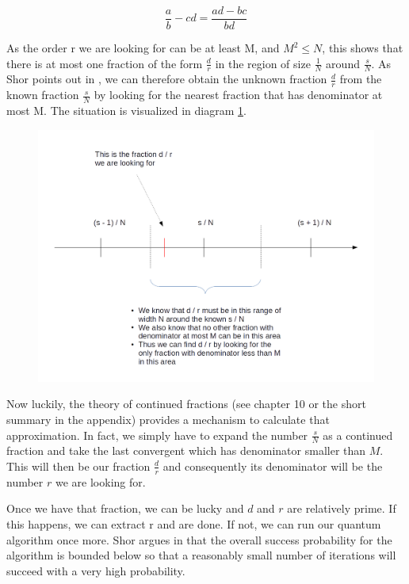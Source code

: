 \documentclass[a4paper, draft]{article}
\theoremstyle{own}
\theoremstyle{remark}
\begin{document}
$$
\frac{a}{b} - {c}{d} = \frac{ad - bc}{bd}
$$
 
As the order r we are looking for can be at least M, and $M^2 \leq N$, this shows that there is at most one fraction of the form $\frac{d}{r}$ in the region of size $\frac{1}{N}$ around $\frac{s}{N}$. As Shor points out in \cite{Shor96}, we can therefore obtain the unknown fraction $\frac{d}{r}$ from the known fraction $\frac{s}{N}$ by looking for the nearest fraction that has denominator at most M. The situation is visualized in diagram \ref{fig:ShorContinuedFraction}.

\begin{figure}[ht]
\centering
\includegraphics[width=1.0\linewidth]{images/ShorContinuedFraction}
\caption[Locating the fraction d / r]{}
\label{fig:ShorContinuedFraction}
\end{figure}

Now luckily, the theory of continued fractions (see \cite{HW} chapter 10 or the short summary in the appendix) provides a mechanism to calculate that approximation. In fact, we simply have to expand the number $\frac{s}{N}$ as a continued fraction and take the last convergent which has denominator smaller than $M$. This will then be our fraction $\frac{d}{r}$ and consequently its denominator will be the number $r$ we are looking for.

Once we have that fraction, we can be lucky and $d$ and $r$ are relatively prime. If this happens, we can extract r and are done. If not, we can run our quantum algorithm once more. Shor argues in \cite{Shor96} that the overall success probability for the algorithm is bounded below so that a reasonably small number of iterations will succeed with a very high probability. 
\end{document}
